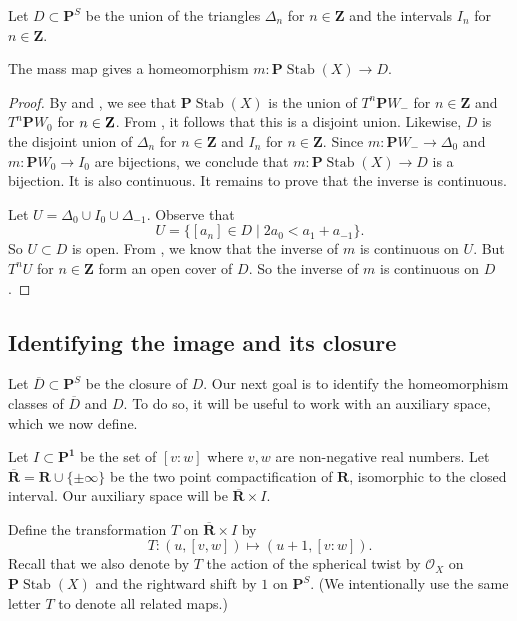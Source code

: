 \documentclass{amsart}
\begin{document}
Let \(D \subset \mathbf{P}^S\) be the union of the triangles \(\Delta_n\) for \(n \in \mathbf{Z}\) and the intervals \(I_n\) for \(n \in \mathbf{Z}\).
\begin{theorem}\label{thm:homeo}
  The mass map gives a homeomorphism \(m \colon \mathbf{P} \operatorname{Stab}(X) \to D\).
\end{theorem}
\begin{proof}
  By  and , we see that \(\mathbf{P}\operatorname{Stab}(X)\) is the union of \(T^n \mathbf{P}W_-\) for \(n \in \mathbf{Z}\) and \(T^n \mathbf{P} W_0\) for \(n \in {\bf Z}\).
  From , it follows that this is a disjoint union.
  Likewise, \(D\) is the disjoint union of \(\Delta_n\) for \(n \in \mathbf{Z}\) and \(I_n\) for \(n \in \mathbf{Z}\).
  Since \(m \colon \mathbf{P}W_- \to \Delta_0\) and \(m \colon \mathbf{P}W_0 \to I_0\) are bijections, we conclude that \(m \colon \mathbf{P} \operatorname{Stab}(X) \to D\) is a bijection.
  It is also continuous.
  It remains to prove that the inverse is continuous.

  Let \(U = \Delta_0 \cup I_0 \cup \Delta_{-1}\).
  Observe that
  \[ U = \{[a_n] \in D \mid 2a_0 < a_1 + a_{-1}\}.\]
  So \(U \subset D\) is open.
  From , we know that the inverse of \(m\) is continuous on \(U\).
  But \(T^n U\) for \(n \in \mathbf{Z}\) form an open cover of \(D\).
  So the inverse of \(m\) is continuous on \(D\).
\end{proof}

\subsection{Identifying the image and its closure}
Let \(\overline D \subset \mathbf{P}^S\) be the closure of \(D\).
Our next goal is to identify the homeomorphism classes of \(\overline D\) and \(D\).
To do so, it will be useful to work with an auxiliary space, which we now define.

Let \(I  \subset \mathbf{P^1}\) be the set of \([v:w]\) where \(v, w\) are non-negative real numbers.
Let \(\overline {\mathbf{R}} = \mathbf{R} \cup \{\pm \infty\}\) be the two point compactification of \(\mathbf{R}\), isomorphic to the closed interval.
Our auxiliary space will be \(\overline{\mathbf{R}} \times I\).

Define the transformation \(T\) on \(\overline{\mathbf{R}} \times I\) by
\[ T \colon (u,[v,w]) \mapsto (u+1,[v:w]).\]
Recall that we also denote by \(T\) the action of the spherical twist by \(\mathcal{O}_X\) on \(\mathbf{P} \operatorname{Stab}(X)\) and the rightward shift by \(1\) on \(\mathbf{P}^S\).
(We intentionally use the same letter \(T\) to denote all related maps.)
\end{document}
